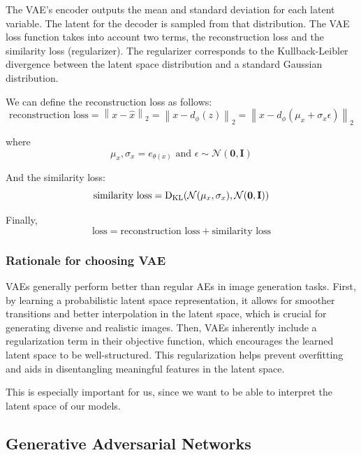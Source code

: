 \documentclass{article}
\begin{document}
The VAE's encoder outputs the mean and standard deviation for each latent variable. The latent for the decoder is sampled from that distribution.
The VAE loss function takes into account two terms, the reconstruction loss and the similarity loss (regularizer). 
The regularizer corresponds to the Kullback-Leibler divergence between the latent space distribution and a standard Gaussian distribution.
  
We can define the reconstruction loss as follows:
$$\text{reconstruction loss} = \left\| x -\hat{x}\right\|_{2}=\left\| x-d_{\phi}(z) \right\|_{2}=\left\| x-d_{\phi}(\mu_{x}+\sigma_{x}\epsilon) \right\|_{2}$$

where
$$\mu_{x},\sigma_{x}=e_{\theta(x)} \text{ and } \epsilon\sim\mathcal{N}(\textbf{0},\textbf{I})$$


And the similarity loss:
$$\text{similarity loss}=\mathrm{D}_{\mathrm{KL}}(\mathcal{N}(\mu_{x},\sigma_{x}), \mathcal{N}(\textbf{0},\textbf{I})) \\$$

Finally,
$$\text{loss}=\text{reconstruction loss}+\text{similarity loss}$$

\subsubsection*{Rationale for choosing VAE}
VAEs generally perform better than regular AEs in image generation tasks. 
First, by learning a probabilistic latent space representation, it allows for smoother transitions and better interpolation in the latent space, which is crucial for generating diverse and realistic images. 
Then, VAEs inherently include a regularization term in their objective function, which encourages the learned latent space to be well-structured. 
This regularization helps prevent overfitting and aids in disentangling meaningful features in the latent space.
  
This is especially important for us, since we want to be able to interpret the latent space of our models.


\subsection{Generative Adversarial Networks}
\end{document}
